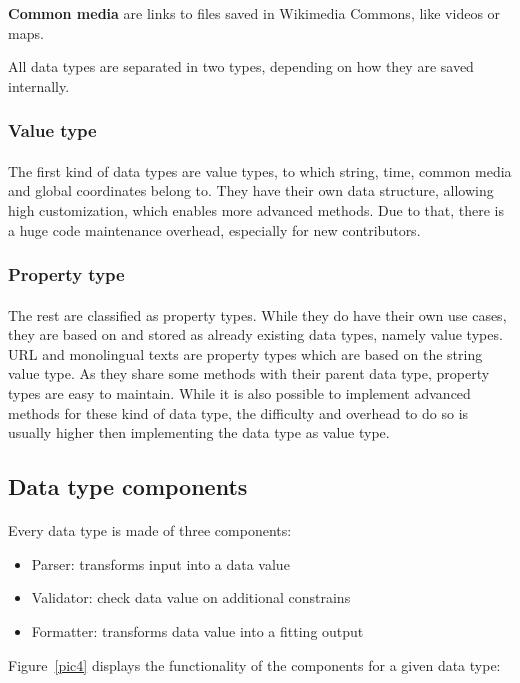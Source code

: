 \documentclass[12pt]{article}
\begin{document}
\textbf{Common media} are links to files saved in Wikimedia Commons, like videos or maps.

All data types are separated in two types, depending on how they are saved internally. 

\subsubsection{Value type}
\paragraph{}
The first kind of data types are value types, to which string, time, common media and global coordinates belong to. They have their own data structure, allowing high customization, which enables more advanced methods. Due to that, there is a huge code maintenance overhead, especially for new contributors. 

\subsubsection{Property type}
\paragraph{}
The rest are classified as property types. While they do have their own use cases, they are based on and stored as already existing data types, namely value types. URL and monolingual texts are property types which are based on the string value type. As they share some methods with their parent data type, property types are easy to maintain. While it is also possible to implement advanced methods for these kind of data type, the difficulty and overhead to do so is usually higher then implementing the data type as value type.

\subsection{Data type components}
\paragraph{}
Every data type is made of three components:

\begin{itemize}
\item	Parser: transforms input into a data value
\item	Validator: check data value on additional constrains
\item	Formatter: transforms data value into a fitting output
\end{itemize}
Figure~\ref{pic4} displays the functionality of the components for a given data type:
\end{document}
